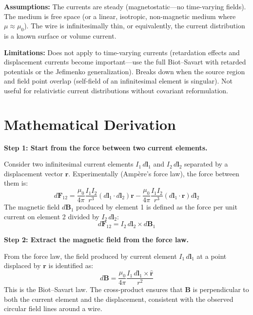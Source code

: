 \textbf{Assumptions:} The currents are steady (magnetostatic---no time-varying fields). The medium is free space (or a linear, isotropic, non-magnetic medium where $\mu \approx \mu_0$). The wire is infinitesimally thin, or equivalently, the current distribution is a known surface or volume current.


\textbf{Limitations:} Does not apply to time-varying currents (retardation effects and displacement currents become important---use the full Biot--Savart with retarded potentials or the Jefimenko generalization). Breaks down when the source region and field point overlap (self-field of an infinitesimal element is singular). Not useful for relativistic current distributions without covariant reformulation.


\section*{Mathematical Derivation}

\textbf{Step 1: Start from the force between two current elements.}

Consider two infinitesimal current elements $I_1\,d\mathbf{l}_1$ and $I_2\,d\mathbf{l}_2$ separated by a displacement vector $\mathbf{r}$. Experimentally (Ampère's force law), the force between them is:
\begin{equation}
d\mathbf{F}_{12} = \frac{\mu_0}{4\pi}\frac{I_1 I_2}{r^3}\left(d\mathbf{l}_1\cdot d\mathbf{l}_2\right)\mathbf{r} - \frac{\mu_0}{4\pi}\frac{I_1 I_2}{r^3}\left(d\mathbf{l}_1\cdot\mathbf{r}\right)d\mathbf{l}_2
\end{equation}
The magnetic field $d\mathbf{B}_1$ produced by element 1 is defined as the force per unit current on element 2 divided by $I_2\,d\mathbf{l}_2$:
\begin{equation}
d\mathbf{F}_{12} = I_2\,d\mathbf{l}_2 \times d\mathbf{B}_1
\end{equation}

\textbf{Step 2: Extract the magnetic field from the force law.}

From the force law, the field produced by current element $I_1\,d\mathbf{l}_1$ at a point displaced by $\mathbf{r}$ is identified as:
\begin{equation}
d\mathbf{B} = \frac{\mu_0}{4\pi}\frac{I_1\,d\mathbf{l}_1 \times \hat{\mathbf{r}}}{r^2}
\end{equation}
This is the Biot--Savart law. The cross-product ensures that $\mathbf{B}$ is perpendicular to both the current element and the displacement, consistent with the observed circular field lines around a wire.

